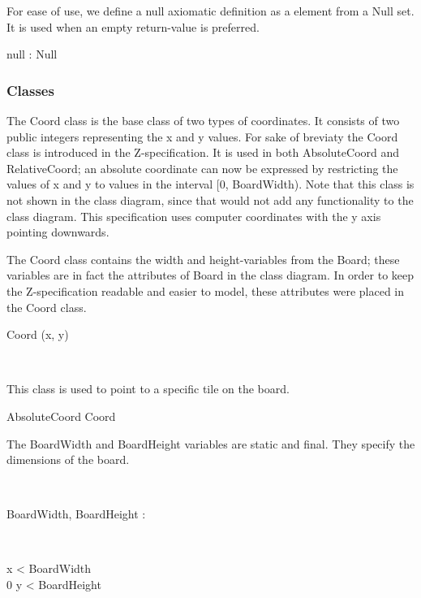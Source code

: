 \documentclass[12pt]{article}
\begin{document}
For ease of use, we define a null axiomatic definition as a element from a Null set. It is used when an empty return-value is preferred.
\begin{zed}
[Null]
\end{zed}
\begin{axdef}
null : Null
\end{axdef}

\subsubsection{Classes}

The Coord class is the base class of two types of coordinates. It consists of two public integers representing the x and y values.
For sake of breviaty the Coord class is introduced in the Z-specification. It is used in both AbsoluteCoord and RelativeCoord; an absolute coordinate can now be expressed by restricting the values of x and y to values in the interval [0, BoardWidth). Note that this class is not shown in the class diagram, since that would not add any functionality to the class diagram. This specification uses computer coordinates with the y axis pointing downwards.

The Coord class contains the width and height-variables from the Board; these variables are in fact the attributes of Board in the class diagram. In order to keep the Z-specification readable and easier to model, these attributes were placed in the Coord class.
\begin{class}{Coord}
\upharpoonright (x, y) \\
 \\
\end{class}

This class is used to point to a specific tile on the board.
\begin{class}{AbsoluteCoord}
Coord \\
\begin{zpar}
The BoardWidth and BoardHeight variables are static and final. They specify the dimensions of the board.
\end{zpar} \\
\begin{axdef}
BoardWidth, BoardHeight : \nat
\end{axdef} \\
\begin{state}
 \leq x < BoardWidth \\
0 \leq y < BoardHeight
\end{state}
\end{class}
\end{document}
